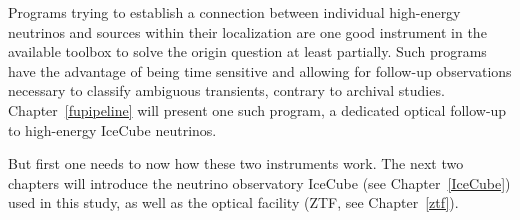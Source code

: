 Programs trying to establish a connection between individual high-energy neutrinos and sources within their localization are one good instrument in the available toolbox to solve the origin question at least partially. Such programs have the advantage of being time sensitive and allowing for follow-up observations necessary to classify ambiguous transients, contrary to archival studies. Chapter~\ref{fupipeline} will present one such program, a dedicated optical follow-up to high-energy IceCube neutrinos.

But first one needs to now how these two instruments work. The next two chapters will introduce the neutrino observatory IceCube (see Chapter~\ref{IceCube}) used in this study, as well as the optical facility (ZTF, see Chapter~\ref{ztf}).